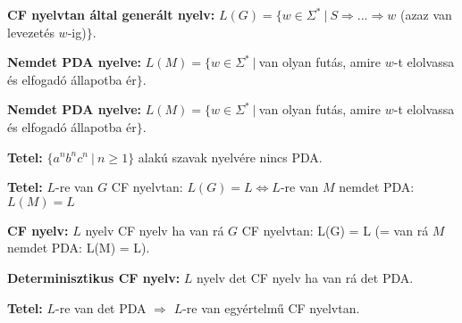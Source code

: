 \documentclass[a4paper]{article}
\begin{document}
\begin{tcolorbox}[size = fbox]
  \textbf{CF nyelvtan által generált nyelv:} $L(G) = \{w \in \Sigma^{*}\ |\ S \Rightarrow ... \Rightarrow w$ (azaz van levezetés $w$-ig)$\}$.
\end{tcolorbox}

\begin{tcolorbox}[size = fbox]
  \textbf{Nemdet PDA nyelve:} $L(M) = \{w \in \Sigma^{*}\ |\ $van olyan futás, amire $w$-t elolvassa és elfogadó állapotba ér$\}$.
\end{tcolorbox}

\begin{tcolorbox}[size = fbox]
  \textbf{Nemdet PDA nyelve:} $L(M) = \{w \in \Sigma^{*}\ |\ $van olyan futás, amire $w$-t elolvassa és elfogadó állapotba ér$\}$.
\end{tcolorbox}

\begin{tcolorbox}[size = fbox]
  \textbf{Tetel:} $\{a^{n}b^{n}c^{n}\ |\ n \geq 1 \}$ alakú szavak nyelvére nincs PDA.
\end{tcolorbox}

\begin{tcolorbox}[size = fbox]
  \textbf{Tetel:} $L$-re van $G$ CF nyelvtan: $L(G) = L \Longleftrightarrow L$-re van $M$ nemdet PDA: $L(M) = L$
\end{tcolorbox}

\begin{tcolorbox}[size = fbox]
  \textbf{CF nyelv:} $L$ nyelv CF nyelv ha van rá $G$ CF nyelvtan: L(G) = L (= van rá $M$ nemdet PDA: L(M) = L).
\end{tcolorbox}

\begin{tcolorbox}[size = fbox]
  \textbf{Determinisztikus CF nyelv:} $L$ nyelv det CF nyelv ha van rá det PDA.
\end{tcolorbox}

\begin{tcolorbox}[size = fbox]
  \textbf{Tetel:} $L$-re van det PDA $\Rightarrow$ $L$-re van egyértelmű CF nyelvtan.
\end{tcolorbox}
\end{document}
